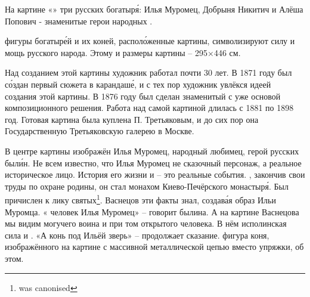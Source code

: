 На картине «»  три русских богатыр\'{я}: Илья Муромец, Добрыня Никитич и Алёша Попович - знаменитые герои народных .

 фигуры богатыр\'{е}й и их коней, распол\'{о}женные  картины, символизируют силу и мощь русского народа. Этому   и  размеры картины -- 295$\times$446 см.

Над созданием этой картины художник работал почти 30 лет. В 1871 году был с\'{о}здан первый  сюжета в карандаш\'{е}, и с тех пор художник увлёкся идеей создания этой картины. В 1876 году был сделан знаменитый  с уже  основой композиционного решения. Работа над самой картиной длилась с 1881 по 1898 год. Готовая картина была куплена П. Третьяковым, и до сих пор она  Государственную Третьяковскую галерею в Москве.

В центре картины изображён Илья Муромец, народный любимец, герой русских был\'{и}н. Не всем известно, что Илья Муромец не сказочный персонаж, а реальное историческое лицо. История его жизни и   -- это реальные события. , закончив свои труды по охране родины, он стал монахом Киево-Печёрского монастыр\'{я}. Был причислен к лику святых\footnote{was canonised}. Васнецов эти факты знал, создав\'{а}я образ Ильи Муромца. « человек Илья Муромец» -- говорит былина. А на картине Васнецова мы видим могучего воина и при том  открытого человека. В нём  исполинская сила и . «А конь под Ильёй  зверь» -- продолжает сказание.  фигура коня, изображённого на картине с массивной металлической цепью вместо упряжки,  об этом.

